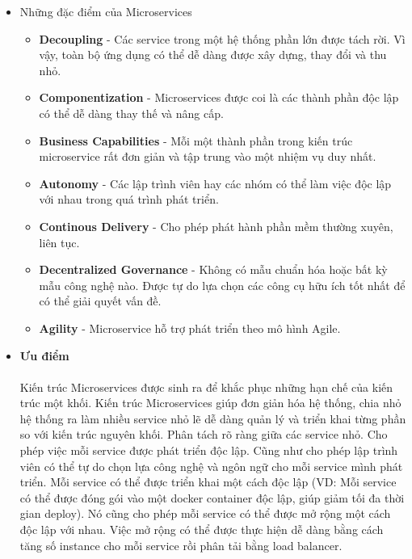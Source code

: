         \begin{itemize}
            \item Những đặc điểm của Microservices
            \begin{itemize}
                \item \textbf{Decoupling} - Các service trong một hệ thống phần lớn được tách rời. Vì vậy, toàn bộ ứng dụng có thể dễ dàng được xây dựng, thay đổi và thu nhỏ.
                \item \textbf{Componentization} - Microservices được coi là các thành phần độc lập có thể dễ dàng thay thế và nâng cấp.
                \item \textbf{Business Capabilities} - Mỗi một thành phần trong kiến trúc microservice rất đơn giản và tập trung vào một nhiệm vụ duy nhất.
                \item \textbf{Autonomy} - Các lập trình viên hay các nhóm có thể làm việc độc lập với nhau trong quá trình phát triển.
                \item \textbf{Continous Delivery} - Cho phép phát hành phần mềm thường xuyên, liên tục.
                \item \textbf{Decentralized Governance} - Không có mẫu chuẩn hóa hoặc bất kỳ mẫu công nghệ nào. Được tự do lựa chọn các công cụ hữu ích tốt nhất để có thể giải quyết vấn đề.
                \item \textbf{Agility} - Microservice hỗ trợ phát triển theo mô hình Agile.
            \end{itemize}
            \item \textbf{Ưu điểm}\\\\
            Kiến trúc Microservices được sinh ra để khắc phục những hạn chế của kiến trúc một khối. Kiến trúc Microservices giúp đơn giản hóa hệ thống, chia nhỏ hệ thống ra làm nhiều service nhỏ lẽ dễ dàng quản lý và triển khai từng phần so với kiến trúc nguyên khối. Phân tách rõ ràng giữa các service nhỏ. Cho phép việc mỗi service được phát triển độc lập. Cũng như cho phép lập trình viên có thể tự do chọn lựa công nghệ và ngôn ngữ cho mỗi service mình phát triển. Mỗi service có thể được triển khai một cách độc lập (VD: Mỗi service có thể được đóng gói vào một docker container độc lập, giúp giảm tối đa thời gian deploy). Nó cũng cho phép mỗi service có thể được mở rộng một cách độc lập với nhau. Việc mở rộng có thể được thực hiện dễ dàng bằng cách tăng số instance cho mỗi service rồi phân tải bằng load balancer.
            \begin{itemize}

\end{itemize}
\end{itemize}
